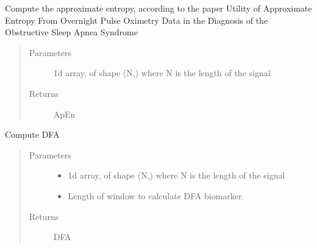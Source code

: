\documentclass[letterpaper,10pt,english]{sphinxmanual}
\begin{document}
\begin{fulllineitems}
\label{\detokenize{pobm.spo2:pobm.spo2.single_biomarkers.apen}}
Compute the approximate entropy, according to the paper
Utility of Approximate Entropy From Overnight Pulse Oximetry Data in the Diagnosis
of the Obstructive Sleep Apnea Syndrome
\begin{quote}\begin{description}
\item[{Parameters}] \leavevmode
{} \textendash{} 1\sphinxhyphen{}d array, of shape (N,) where N is the length of the signal

\item[{Returns}] \leavevmode
ApEn

\end{description}\end{quote}

\end{fulllineitems}


\begin{fulllineitems}
\label{\detokenize{pobm.spo2:pobm.spo2.single_biomarkers.dfa}}
Compute DFA
\begin{quote}\begin{description}
\item[{Parameters}] \leavevmode\begin{itemize}
\item {} 
 \textendash{} 1\sphinxhyphen{}d array, of shape (N,) where N is the length of the signal

\item {} 
 \textendash{} Length of window to calculate DFA biomarker.

\end{itemize}

\item[{Returns}] \leavevmode
DFA

\end{description}\end{quote}

\end{fulllineitems}
\end{document}

